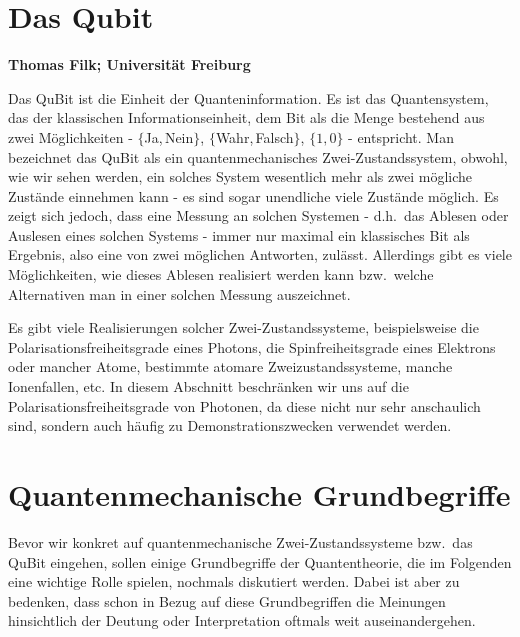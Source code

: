 
\setcounter{page}{1}
\setcounter{section}{0}
\setcounter{figure}{0}
\setcounter{equation}{0}
\setcounter{table}{0}
\setcounter{footnote}{0}

\section*{Das Qubit}
\noindent
{\bf Thomas Filk; Universit\"at Freiburg}
\vspace{1cm}
\label{chap_QuBit}

\noindent
Das QuBit ist die Einheit der Quanteninformation. Es ist das Quantensystem, das der
klassischen Informationseinheit, dem Bit als die Menge bestehend aus zwei M\"oglichkeiten - 
$\{$Ja,\,Nein$\}$, $\{$Wahr,\,Falsch$\}$, $\{1,0\}$ - entspricht. Man bezeichnet das QuBit
als ein quantenmechanisches Zwei-Zustandssystem, obwohl, wie wir sehen werden, ein solches
System wesentlich mehr als zwei m\"ogliche Zust\"ande einnehmen kann - 
es sind sogar unendliche viele Zust\"ande
m\"oglich. Es zeigt sich jedoch, dass eine Messung an solchen Systemen - d.h.\ das Ablesen oder
Auslesen eines solchen Systems - immer nur maximal
ein klassisches Bit als Ergebnis, also eine von zwei m\"oglichen Antworten, zul\"asst. Allerdings
gibt es viele M\"oglichkeiten, wie dieses Ablesen realisiert werden kann bzw.\ welche
Alternativen man in einer solchen Messung auszeichnet. 

Es gibt viele Realisierungen solcher Zwei-Zustandssysteme, beispielsweise die Polarisationsfreiheitsgrade
eines Photons, die Spinfreiheitsgrade eines Elektrons oder mancher Atome, bestimmte atomare Zweizustandssysteme, 
manche Ionenfallen, etc. In diesem Abschnitt beschr\"anken wir uns auf die Polarisationsfreiheitsgrade von Photonen,
da diese nicht nur sehr anschaulich sind, sondern auch h\"aufig zu Demonstrationszwecken verwendet werden.

\section{Quantenmechanische Grundbegriffe}

Bevor wir konkret auf quantenmechanische Zwei-Zustandssysteme bzw.\ das
QuBit eingehen, sollen einige Grundbegriffe der Quantentheorie, die im Folgenden 
eine wichtige Rolle spielen, nochmals diskutiert werden. Dabei ist aber zu bedenken, dass schon in
Bezug auf diese Grundbegriffen die Meinungen hinsichtlich der Deutung oder Interpretation
oftmals weit auseinandergehen. 

